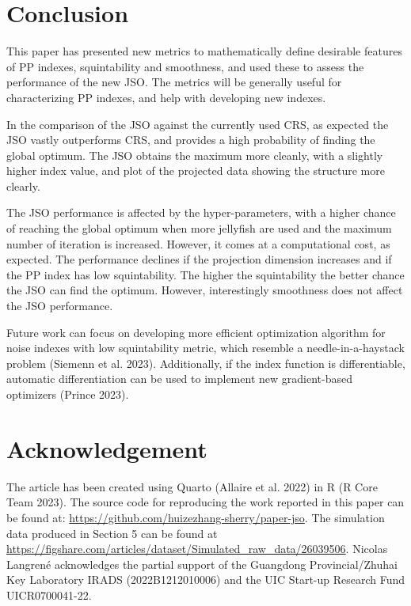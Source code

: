 \documentclass[
  12pt,
]{interact}
\theoremstyle{plain}
\begin{document}
\section{Conclusion}\label{sec-conclusion}

This paper has presented new metrics to mathematically define desirable
features of PP indexes, squintability and smoothness, and used these to
assess the performance of the new JSO. The metrics will be generally
useful for characterizing PP indexes, and help with developing new
indexes.

In the comparison of the JSO against the currently used CRS, as expected
the JSO vastly outperforms CRS, and provides a high probability of
finding the global optimum. The JSO obtains the maximum more cleanly,
with a slightly higher index value, and plot of the projected data
showing the structure more clearly.

The JSO performance is affected by the hyper-parameters, with a higher
chance of reaching the global optimum when more jellyfish are used and
the maximum number of iteration is increased. However, it comes at a
computational cost, as expected. The performance declines if the
projection dimension increases and if the PP index has low
squintability. The higher the squintability the better chance the JSO
can find the optimum. However, interestingly smoothness does not affect
the JSO performance.

Future work can focus on developing more efficient optimization
algorithm for noise indexes with low squintability metric, which
resemble a needle-in-a-haystack problem (Siemenn et al. 2023).
Additionally, if the index function is differentiable, automatic
differentiation can be used to implement new gradient-based optimizers
(Prince 2023).

\section{Acknowledgement}\label{acknowledgement}

The article has been created using Quarto (Allaire et al. 2022) in R (R
Core Team 2023). The source code for reproducing the work reported in
this paper can be found at:
\url{https://github.com/huizezhang-sherry/paper-jso}. The simulation
data produced in Section 5 can be found at
\url{https://figshare.com/articles/dataset/Simulated_raw_data/26039506}.
Nicolas Langrené acknowledges the partial support of the Guangdong
Provincial/Zhuhai Key Laboratory IRADS (2022B1212010006) and the UIC
Start-up Research Fund UICR0700041-22.
\end{document}
